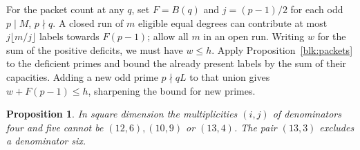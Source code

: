 \documentclass[11pt]{amsart}
\numberwithin{equation}{section}
\newtheorem{proposition}[theorem]{Proposition}
\begin{document}
For the packet count at any $q$, set $F=B(q)$ and $j=(p-1)/2$ for each odd $p\mid M$, $p\nmid q$. A closed run of $m$ eligible equal degrees can contribute at most $j\lfloor m/j\rfloor$ labels towards $F(p-1)$; allow all $m$ in an open run. Writing $w$ for the sum of the positive deficits, we must have $w\le h$. Apply Proposition~\ref{blk:packets} to the deficient primes and bound the already present labels by the sum of their capacities. Adding a new odd prime $p\nmid qL$ to that union gives $w+F(p-1)\le h$, sharpening the bound for new primes.

\begin{proposition}\label{sq:mixed}
In square dimension the multiplicities $(i,j)$ of denominators four and five cannot be $(12,6),(10,9)$ or $(13,4)$. The pair $(13,3)$ excludes a denominator six.
\end{proposition}
\end{document}
